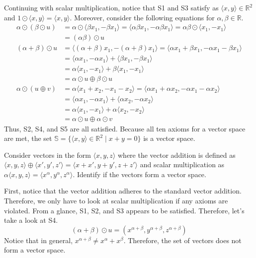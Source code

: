 \documentclass[../main.tex]{subfiles}
\begin{document}
\begin{solution}
Continuing with scalar multiplication, notice that S1 and S3 satisfy
as $\langle x, y \rangle \in \mathbb{R}^2$ and $1 \odot \langle x, y
\rangle = \langle x, y \rangle$. Moreover, consider the following
equations for $\alpha, \beta \in \mathbb{R}$.
\begin{align*}
    \alpha \odot (\beta \odot u)
    &= \alpha \odot \langle \beta x_1, -\beta x_1 \rangle
    = \langle \alpha\beta x_1, -\alpha\beta x_1 \rangle
    = \alpha\beta \odot \langle x_1, -x_1 \rangle \\
    &= (\alpha\beta) \odot u \\
    (\alpha + \beta) \odot u
    &= \langle (\alpha + \beta) x_1, -(\alpha + \beta) x_1 \rangle
    = \langle \alpha x_1 + \beta x_1,
        -\alpha x_1 - \beta x_1 \rangle \\
    &= \langle \alpha x_1, -\alpha x_1 \rangle +
        \langle \beta x_1, -\beta x_1 \rangle \\
    &= \alpha \langle x_1, -x_1 \rangle +
        \beta \langle x_1, -x_1 \rangle \\
    &= \alpha \odot u \oplus \beta \odot u \\
    \alpha \odot (u \oplus v)
    &= \alpha \langle x_1 + x_2, -x_1 - x_2 \rangle
    = \langle \alpha x_1 + \alpha x_2,
        -\alpha x_1 - \alpha x_2 \rangle \\
    &= \langle \alpha x_1, -\alpha x_1 \rangle +
        \langle \alpha x_2, -\alpha x_2 \rangle \\
    &= \alpha \langle x_1, -x_1 \rangle +
        \alpha \langle x_2, -x_2 \rangle \\
    &= \alpha \odot u \oplus \alpha \odot v
\end{align*}
Thus, S2, S4, and S5 are all satisfied. Because all ten axioms for
a vector space are met, the set $\mathbb{S} = \{ \langle x, y \rangle
\in \mathbb{R}^2 \mid x + y = 0 \}$ is a vector space.
\end{solution}

\begin{problem}
Consider vectors in the form $\langle x, y, z \rangle$ where the
vector addition is defined as $\langle x, y, z \rangle \oplus
\langle x', y', z' \rangle = \langle x + x', y + y', z + z' \rangle$
and scalar multiplication as $\alpha \langle x, y, z \rangle =
\langle x^\alpha, y^\alpha, z^\alpha \rangle$. Identify if the vectors
form a vector space.
\end{problem}
\begin{solution}
First, notice that the vector addition adheres to the standard vector
addition. Therefore, we only have to look at scalar multiplication
if any axioms are violated. From a glance, S1, S2, and S3 appears to
be satisfied. Therefore, let's take a look at S4.
\[
(\alpha + \beta) \odot u
= \left(
    x^{\alpha + \beta}, y^{\alpha + \beta}, z^{\alpha + \beta}
\right)
\]
Notice that in general, $x^{\alpha + \beta} \neq x^\alpha + x^\beta$.
Therefore, the set of vectors does not form a vector space.
\end{solution}
\end{document}
